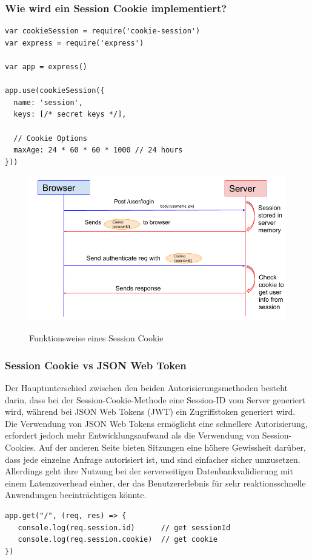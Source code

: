 \subsubsection{Wie wird ein Session Cookie implementiert?}

\begin{lstlisting}[caption=Implementierung Session Cookie]
var cookieSession = require('cookie-session')
var express = require('express')

var app = express()

app.use(cookieSession({
  name: 'session',
  keys: [/* secret keys */],

  // Cookie Options
  maxAge: 24 * 60 * 60 * 1000 // 24 hours
}))
\end{lstlisting}


\begin{figure}[h!]
    \centering
    \includegraphics[width=0.7\linewidth]{pics/session-cookie-funktion.png}
    \caption{Funktionsweise eines Session Cookie}
    \label{fig:enter-label}
    \cite{session_cookie_grafik}
\end{figure}

\subsubsection{Session Cookie vs JSON Web Token}

Der Hauptunterschied zwischen den beiden Autorisierungsmethoden besteht darin, dass bei der Session-Cookie-Methode eine Session-ID vom Server generiert wird, während bei JSON Web Tokens (JWT) ein Zugriffstoken generiert wird. Die Verwendung von JSON Web Tokens ermöglicht eine schnellere Autorisierung, erfordert jedoch mehr Entwicklungsaufwand als die Verwendung von Session-Cookies. Auf der anderen Seite bieten Sitzungen eine höhere Gewissheit darüber, dass jede einzelne Anfrage autorisiert ist, und sind einfacher sicher umzusetzen. Allerdings geht ihre Nutzung bei der serverseitigen Datenbankvalidierung mit einem Latenzoverhead einher, der das Benutzererlebnis für sehr reaktionsschnelle Anwendungen beeinträchtigen könnte.

\begin{lstlisting}
app.get("/", (req, res) => {
   console.log(req.session.id)      // get sessionId
   console.log(req.session.cookie)  // get cookie
})
\end{lstlisting}

\cite{JWT}


